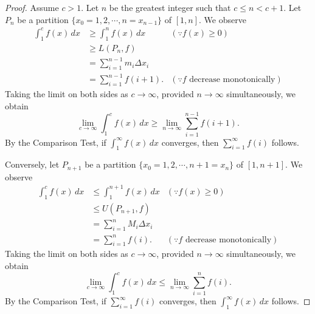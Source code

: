 \begin{Exercise}
	\begin{proof}
		Assume $c>1$.
		Let $n$ be the greatest integer such that $c \leq n < c+1$.
		Let $P_n$ be a partition $\{x_0=1, 2, \cdots, n = x_{n-1}\}$ of $[1,n]$.
		We observe
		\begin{align*}
		\int_{1}^{c} f(x)\,dx
		&\geq \int_{1}^{n} f(x)\,dx & (\because f(x)\geq 0) \\
		&\geq L(P_n, f) \\
		&= \sum_{i=1}^{n-1}m_i \Delta x_i \\
		&= \sum_{i=1}^{n-1} f(i+1). & (\because f \text{ decrease monotonically})
		\end{align*}
		Taking the limit on both sides as $c\to\infty$, provided $n\to\infty$ simultaneously, we obtain
		$$
		\lim_{c\to\infty} \int_{1}^{c} f(x)\,dx
		\geq \lim_{n\to\infty} \sum_{i=1}^{n-1} f(i+1).
		$$
		By the Comparison Test, if $\int_{1}^{\infty} f(x)\,dx$ converges, then $\sum_{i=1}^{\infty} f(i)$ follows.
		
		Conversely, let $P_{n+1}$ be a partition $\{x_0=1, 2, \cdots, n+1 = x_{n}\}$ of $[1,n+1]$.
		We observe
		\begin{align*}
		\int_{1}^{c} f(x)\,dx
		&\leq \int_{1}^{n+1} f(x)\,dx & (\because f(x)\geq 0) \\
		&\leq U(P_{n+1}, f) \\
		&= \sum_{i=1}^{n}M_i \Delta x_i \\
		&= \sum_{i=1}^{n} f(i). & (\because f \text{ decrease monotonically})
		\end{align*}
		Taking the limit on both sides as $c\to\infty$, provided $n\to\infty$ simultaneously, we obtain
		$$
		\lim_{c\to\infty} \int_{1}^{c} f(x)\,dx
		\leq \lim_{n\to\infty} \sum_{i=1}^{n} f(i).
		$$
		By the Comparison Test, if $\sum_{i=1}^{\infty} f(i)$ converges, then $\int_{1}^{\infty} f(x)\,dx$ follows.
	\end{proof}
\end{Exercise}